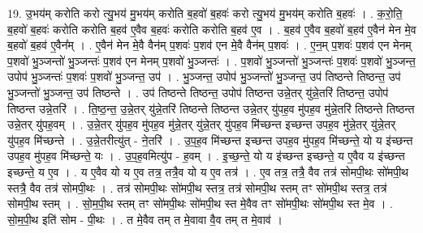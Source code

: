 \documentclass[17pt]{extarticle}
\begin{document}
19. उ॒भय॑म् करोति करो त्यु॒भय॑ मु॒भय॑म् करोति ब॒हवो॑ ब॒हवः॑ करो त्यु॒भय॑ मु॒भय॑म् करोति ब॒हवः॑ । . क॒रो॒ति॒ ब॒हवो॑ ब॒हवः॑ करोति करोति ब॒हव॑ ए॒वैव ब॒हवः॑ करोति करोति ब॒हव॑ ए॒व । . ब॒हव॑ ए॒वैव ब॒हवो॑ ब॒हव॑ ए॒वैन॑ मेन मे॒व ब॒हवो॑ ब॒हव॑ ए॒वैन᳚म् । . ए॒वैन॑ मेन मे॒वै वैन॑म् प॒शवः॑ प॒शव॑ एन मे॒वै वैन॑म् प॒शवः॑ । . ए॒न॒म् प॒शवः॑ प॒शव॑ एन मेनम् प॒शवो॑ भु॒ञ्जन्तो॑ भु॒ञ्जन्तः॑ प॒शव॑ एन मेनम् प॒शवो॑ भु॒ञ्जन्तः॑ । . प॒शवो॑ भु॒ञ्जन्तो॑ भु॒ञ्जन्तः॑ प॒शवः॑ प॒शवो॑ भु॒ञ्जन्त॒ उपोप॑ भु॒ञ्जन्तः॑ प॒शवः॑ प॒शवो॑ भु॒ञ्जन्त॒ उप॑ । . भु॒ञ्जन्त॒ उपोप॑ भु॒ञ्जन्तो॑ भु॒ञ्जन्त॒ उप॑ तिष्ठन्ते तिष्ठन्त॒ उप॑ भु॒ञ्जन्तो॑ भु॒ञ्जन्त॒ उप॑ तिष्ठन्ते । . उप॑ तिष्ठन्ते तिष्ठन्त॒ उपोप॑ तिष्ठन्त उन्ने॒तर् यु॑न्ने॒तरि॑ तिष्ठन्त॒ उपोप॑ तिष्ठन्त उन्ने॒तरि॑ । . ति॒ष्ठ॒न्त॒ उ॒न्ने॒तर् यु॑न्ने॒तरि॑ तिष्ठन्ते तिष्ठन्त उन्ने॒तर् यु॑पह॒व मु॑पह॒व मु॑न्ने॒तरि॑ तिष्ठन्ते तिष्ठन्त उन्ने॒तर् यु॑पह॒वम् । . उ॒न्ने॒तर् यु॑पह॒व मु॑पह॒व मु॑न्ने॒तर् यु॑न्ने॒तर् यु॑पह॒व मि॑च्छन्त इच्छन्त उपह॒व मु॑न्ने॒तर् यु॑न्ने॒तर् यु॑पह॒व मि॑च्छन्ते । . उ॒न्ने॒तरीत्यु॑त् - ने॒तरि॑ । . उ॒प॒ह॒व मि॑च्छन्त इच्छन्त उपह॒व मु॑पह॒व मि॑च्छन्ते॒ यो य इ॑च्छन्त उपह॒व मु॑पह॒व मि॑च्छन्ते॒ यः । . उ॒प॒ह॒वमित्यु॑प - ह॒वम् । . इ॒च्छ॒न्ते॒ यो य इ॑च्छन्त इच्छन्ते॒ य ए॒वैव य इ॑च्छन्त इच्छन्ते॒ य ए॒व । . य ए॒वैव यो य ए॒व तत्र॒ तत्रै॒व यो य ए॒व तत्र॑ । . ए॒व तत्र॒ तत्रै॒ वैव तत्र॑ सोमपी॒थः सो॑मपी॒थ स्तत्रै॒ वैव तत्र॑ सोमपी॒थः । . तत्र॑ सोमपी॒थः सो॑मपी॒थ स्तत्र॒ तत्र॑ सोमपी॒थ स्तम् तꣳ सो॑मपी॒थ स्तत्र॒ तत्र॑ सोमपी॒थ स्तम् । . सो॒म॒पी॒थ स्तम् तꣳ सो॑मपी॒थः सो॑मपी॒थ स्त मे॒वैव तꣳ सो॑मपी॒थः सो॑मपी॒थ स्त मे॒व । . सो॒म॒पी॒थ इति॑ सोम - पी॒थः । . त मे॒वैव तम् त मे॒वावा वै॒व तम् त मे॒वाव॑ । \newline
\end{document}
